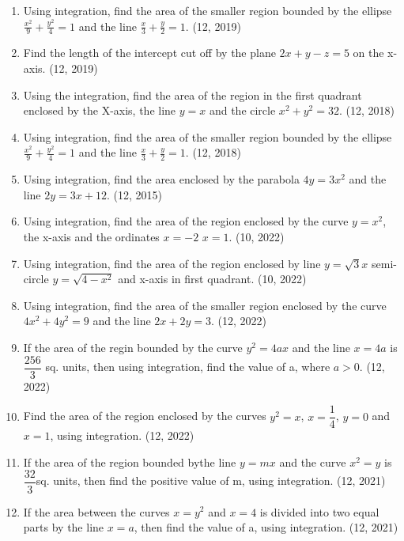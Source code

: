 \begin{enumerate}[label=\thesubsection.\arabic*,ref=\thesubsection.\theenumi]
\item Using integration, find the area of the smaller region bounded by the ellipse $\frac{x^{2}}{9}+\frac{y^{2}}{4}=1$ and the line $\frac{x}{3}+\frac{y}{2}=1$. \hfill (12, 2019)
\item Find the length of the intercept cut off by the plane $2x+y-z=5$ on the x-axis. \hfill (12, 2019)
\item Using the integration, find the area of the region in the first quadrant enclosed by the X-axis, the line $y=x$ and the circle $x^{2}+y^{2}=32$. \hfill (12, 2018)
\item Using integration, find the area of the smaller region bounded by the ellipse $\frac{x^{2}}{9}+\frac{y^{2}}{4}=1$ and the line $\frac{x}{3}+\frac{y}{2}=1$. \hfill (12, 2018)
\item Using integration, find the area enclosed by the parabola $4y = 3x^2$ and the line $2y = 3x+12$. 
\hfill (12, 2015)
\item Using integration, find the area of the region enclosed by the curve $ y=x^2 $, the x-axis and the ordinates $x=-2$  $x=1$.
\hfill (10, 2022)
\item Using integration, find the area of the region enclosed by line $y=\sqrt{3}x$ semi-circle $y=\sqrt{4-x^2}$ and x-axis in first quadrant.
\hfill (10, 2022)
\item Using integration, find the area of the smaller region enclosed by the curve ${4x^2 + 4y^2} = 9$ and the line $2x + 2y =3$.
\hfill (12, 2022)
\item If the area of the regin bounded by the curve $y^2 = 4ax$ and the line $x = 4a$ is $\dfrac{256}{3}$\hspace{0.2cm} sq. units, then using integration, find the value of a, where $a>0$.
\hfill (12, 2022)
\item Find the area of the region enclosed by the curves $y^2=x$, $x=\dfrac{1}{4}$,  $y=0$ and $x=1$, using integration.
\hfill (12, 2022)
\item If the area of the region bounded bythe line $y=mx$ and the curve $x^2=y$ is $\dfrac{32}{3}$\hspace{0.2cm}sq. units, then find the positive value of m, using integration.
\hfill (12, 2021)
\item If the area between the curves $x = y^2$ and $x = 4$ is divided into two equal parts by the line $x = a$, then find the value of a, using integration.
\hfill (12, 2021)


\end{enumerate}
